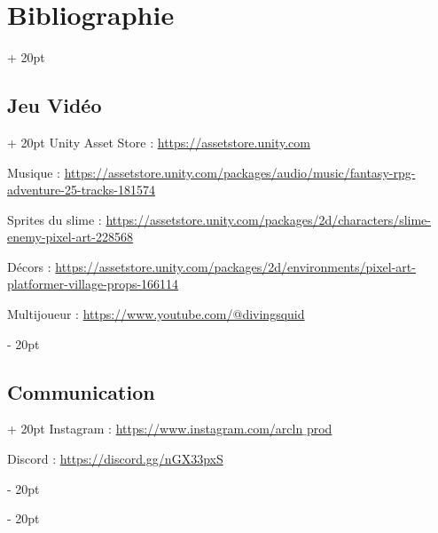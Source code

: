 \documentclass[a4paper, 12pt, twoside]{article}
\newcommand{\ind}[1][20pt]{\advance\leftskip + #1}
\newcommand{\deind}[1][20pt]{\advance\leftskip - #1}
\newenvironment{indt}[2][20pt]{#2 \par \ind[#1]}{\par \deind} %
\begin{document}
    \begin{indt}{\section{Bibliographie}}

        \begin{indt}{\subsection{Jeu Vidéo}}
            Unity Asset Store : \href{url}{https://assetstore.unity.com}

            Musique : \href{url}{https://assetstore.unity.com/packages/audio/music/fantasy-rpg-adventure-25-tracks-181574}

            Sprites du slime : \href{url}{https://assetstore.unity.com/packages/2d/characters/slime-enemy-pixel-art-228568}

            Décors : \href{url}{https://assetstore.unity.com/packages/2d/environments/pixel-art-platformer-village-props-166114}

            Multijoueur : \href{url}{https://www.youtube.com/@divingsquid}


        \end{indt}

        \begin{indt}{\subsection{Communication}}
            Instagram : \href{url}{https://www.instagram.com/arcln$\_$prod}

            Discord : \href{url}{https://discord.gg/nGX33pxS}
        \end{indt}
    \end{indt}
\end{document}
